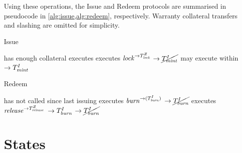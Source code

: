 Using these operations, the Issue and Redeem protocols are summarised in pseudocode in \cref{alg:issue,alg:redeem}, respectively.
Warranty collateral transfers and slashing are omitted for simplicity.

\begin{minipage}[t]{.48\textwidth}
\begin{algorithm}[H]
    \caption{Issue}\label{alg:issue}
    \footnotesize
    \begin{algorithmic}[1]
        \REQUIRE \vault has enough collateral
        \STATE \vault executes \submitPOCop
            \STATE \issuer executes $\mathit{lock} ^{\rightarrow T^Z_{\mathit{lock}}}$ 
                    \STATE $\rightarrow \cancel{T^I_{\mathit{mint}}}$
                \ELSE
                    \STATE \vault may execute \confirmIssueop within \dci
                    \STATE $\rightarrow T^I_{\mathit{mint}}$
                \ENDIF
            \ENDIF
        \ENDIF
    \end{algorithmic}
\end{algorithm}
\end{minipage}%
\hfill
\begin{minipage}[t]{.48\textwidth}
\centering
\begin{algorithm}[H]
    \caption{Redeem}\label{alg:redeem}
    \footnotesize
    \begin{algorithmic}[1]
        \REQUIRE \vault has not called \submitPOIop since last issuing
        \STATE \redeemer executes $\mathit{burn} ^{\rightarrow (T^I_{\mathit{burn}})}$
            \STATE $\rightarrow \cancel{T^I_{\mathit{burn}}}$
        \ELSE
            \STATE \vault executes $\mathit{release} ^{\rightarrow T^Z_{\mathit{release}}}$
                \STATE $\rightarrow T^I_{\mathit{burn}}$
            \ELSE
                \STATE $\rightarrow \cancel{T^I_{\mathit{burn}}}$
            \ENDIF
        \ENDIF
    \end{algorithmic}
\end{algorithm}
\end{minipage}


\section{States}

